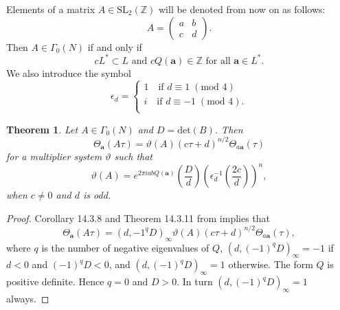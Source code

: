 \documentclass{article}
\newtheorem{theorem}{Theorem}%
\theoremstyle{definition}
\newcommand{\ZZ} {{\mathbb Z}}		%
\begin{document}
Elements of a matrix $A \in \mathrm{SL}_2( \ZZ)$ will be denoted from now on as follows:
\begin{equation}
\label{eq:matrix}
A=\begin{pmatrix}
a & b \\ c & d
\end{pmatrix}.\end{equation}
Then $A \in \Gamma_0(N)$ if and only if
\[  cL^{\ast} \subset L \textrm{ and } cQ(\mathbf{a}) \in  
\ZZ \textrm{ for all } \mathbf{a} \in L^{\ast}. \]
We also introduce the symbol 
\begin{equation}
\label{eq:epsilondef}
\epsilon_d  = \begin{cases}
1 \quad \textrm{if } d\equiv 1 \; (\textrm{mod } 4) \\
i \quad \textrm{if } d\equiv -1 \; (\textrm{mod } 4). \\
\end{cases}
\end{equation}

\begin{theorem} 
	\label{thm:modthm}
	Let $A \in \Gamma_0(N)$ and  $D = \mathrm{det}(B)$.
	Then
	\[ \Theta_{\mathbf{a}}(A\tau)= \vartheta(A)(c\tau+d)^{n/2} \Theta_{a\mathbf{a}}(\tau) \]
	for a multiplier system $\vartheta$ such that
	\[ \vartheta(A)=e^{2 \pi i ab Q(\mathbf{a})}
	 \left(\frac{D}{d}\right)\left(\epsilon^{-1}_d \left(\frac{2c}{d}\right)\right)^n, \]
	when $c \neq 0$ and $d$ is odd.
\end{theorem}
\begin{proof}
Corollary 14.3.8 and Theorem 14.3.11 from \cite{cohen2017modular} implies that
\[ \Theta_{\mathbf{a}}(A\tau)= (d,-1^{q}D)_{\infty}\vartheta(A)(c\tau+d)^{n/2}
\Theta_{a\mathbf{a}}(\tau), \]
where $q$ is the number of negative eigenvalues of $Q$, $(d,(-1)^{q}D)_{\infty}= -1$ if 
$d<0$ and $(-1)^{q}D < 0$, and $(d,(-1)^{q}D)_{\infty}= 1$ otherwise. The form $Q$ is 
positive definite. Hence $q=0$ and $D>0$. In turn $(d,(-1)^{q}D)_{\infty}= 1$ always.
\end{proof}
\end{document}
